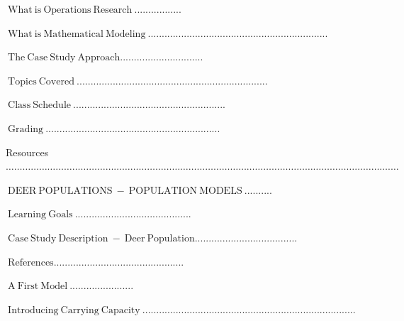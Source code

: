 \documentclass[10pt]{article}
\begin{document}
$\mathrm{~ W h a t ~ i s ~ O p e r a t i o n s ~ R e s e a r c h ~ . . . . . . . . . . . . . . . . .}$

$\mathrm{~ W h a t ~ i s ~ M a t h e m a t i c a l ~ M o d e l i n g ~ . . . . . . . . . . . . . . . . . . . . . . . . . . . . . . . . . . . . . . . . . . . . . . . . . . . . . . . . . . . . . . . . .}$

$\mathrm{~ T h e ~ C a s e ~ S t u d y ~ A p p r o a c h . . . . . . . . . . . . . . . . . . . . . . . . . . . . . .}$

$\mathrm{~ T o p i c s ~ C o v e r e d ~ . . . . . . . . . . . . . . . . . . . . . . . . . . . . . . . . . . . . . . . . . . . . . . . . . . . . . . . . . . . . . . . . . . . . .}$

$\mathrm{~ C l a s s ~ S c h e d u l e ~ . . . . . . . . . . . . . . . . . . . . . . . . . . . . . . . . . . . . . . . . . . . . . . . . . . . . . . .}$

$\mathrm{~ G r a d i n g ~ . . . . . . . . . . . . . . . . . . . . . . . . . . . . . . . . . . . . . . . . . . . . . . . . . . . . . . . . . . . . . . .}$

Resources $\ldots \ldots \ldots \ldots \ldots \ldots \ldots \ldots \ldots \ldots \ldots \ldots \ldots \ldots \ldots \ldots \ldots \ldots \ldots \ldots \ldots \ldots \ldots \ldots \ldots \ldots \ldots \ldots \ldots \ldots \ldots \ldots \ldots \ldots \ldots \ldots \ldots \ldots \ldots \ldots \ldots \ldots \ldots \ldots \ldots \ldots . \ldots$

$\mathrm{~ D E E R ~ P O P U L A T I O N S ~ - ~ P O P U L A T I O N ~ M O D E L S ~ . . . . . . . . . .}$

$\mathrm{~ L e a r n i n g ~ G o a l s ~ . . . . . . . . . . . . . . . . . . . . . . . . . . . . . . . . . . . . . . . . . .}$

$\mathrm{~ C a s e ~ S t u d y ~ D e s c r i p t i o n ~ - ~ D e e r ~ P o p u l a t i o n . . . . . . . . . . . . . . . . . . . . . . . . . . . . . . . . . . . . .}$

$\mathrm{~ R e f e r e n c e s . . . . . . . . . . . . . . . . . . . . . . . . . . . . . . . . . . . . . . . . . . . . . . .}$

$\mathrm{~ A ~ F i r s t ~ M o d e l ~ . . . . . . . . . . . . . . . . . . . . . . .}$

$\mathrm{~ I n t r o d u c i n g ~ C a r r y i n g ~ C a p a c i t y ~ . . . . . . . . . . . . . . . . . . . . . . . . . . . . . . . . . . . . . . . . . . . . . . . . . . . . . . . . . . . . . . . . . . . . . . . . . . . . .}$
\end{document}
